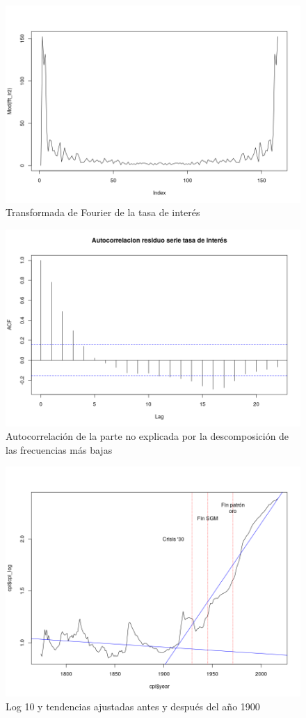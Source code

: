 \documentclass[a4paper]{article}
\begin{document}
\begin{figure}[H]
	\centering
	\includegraphics[width=0.8\linewidth]{ir_fft.png}
	\caption{Transformada de Fourier de la tasa de interés} 	
	\label{fig:ir_fft}
\end{figure}

\begin{figure}[H]
	\centering
	\includegraphics[width=0.8\linewidth]{ir_resid_acf.png}
	\caption{Autocorrelación de la parte no explicada por la descomposición de las frecuencias más bajas} 	
	\label{fig:ir_resid_acf}
\end{figure}

\begin{figure}[H]
	\centering
	\includegraphics[width=0.8\linewidth]{cpi_log10_tend.png}
	\caption{Log 10 y tendencias ajustadas antes y después del año 1900} 	
	\label{fig:cpi_log10_tend}
\end{figure}
\end{document}
